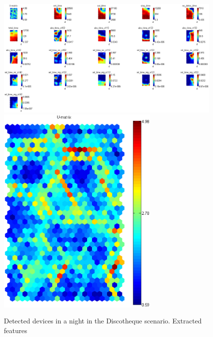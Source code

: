 \documentclass[preprint]{elsarticle}
\begin{document}
\begin{figure}[ht]
	\begin{center}
		\includegraphics[width=14cm]{imgs/DISCO/som_disco_no_detec_0.eps}
		\includegraphics[width=8cm]{imgs/DISCO/umatrix_disco_no_detec_0.eps}
		\caption{Detected devices in a night in the Discotheque scenario. Extracted features}
		\label{fig:som_disco_no_detec_0}
	\end{center}
\end{figure}
\end{document}
